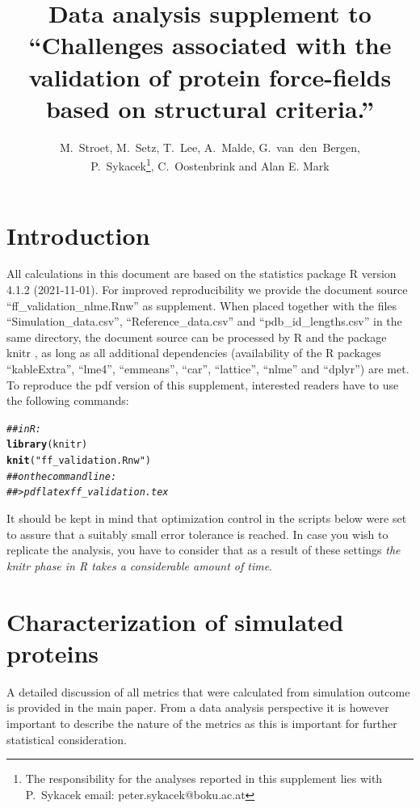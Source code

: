 \documentclass{article}\usepackage[table]{xcolor}
\title{Data analysis supplement to ``Challenges associated with the validation 
  of protein force-fields based on structural criteria.''}
\author{M.~Stroet, M.~Setz, T.~Lee, A.~Malde, G.~van~den~Bergen, 
  \\P.~Sykacek\footnote{The responsibility for the analyses reported 
    in this supplement lies with P.~Sykacek email: peter.sykacek@boku.ac.at}, 
  C.~Oostenbrink and Alan E. Mark}
\makeatletter
\newcommand{\hlstr}[1]{\textcolor[rgb]{0.192,0.494,0.8}{#1}}%
\newcommand{\hlcom}[1]{\textcolor[rgb]{0.678,0.584,0.686}{\textit{#1}}}%
\newcommand{\hlstd}[1]{\textcolor[rgb]{0.345,0.345,0.345}{#1}}%
\newcommand{\hlkwd}[1]{\textcolor[rgb]{0.737,0.353,0.396}{\textbf{#1}}}%
\newenvironment{kframe}{%
 \def\at@end@of@kframe{}%
 \ifinner\ifhmode%
  \def\at@end@of@kframe{\end{minipage}}%
  \begin{minipage}{\columnwidth}%
 \fi\fi%
 \def\FrameCommand##1{\hskip\@totalleftmargin \hskip-\fboxsep
 \colorbox{shadecolor}{##1}\hskip-\fboxsep
     \hskip-\linewidth \hskip-\@totalleftmargin \hskip\columnwidth}%
 \MakeFramed {\advance\hsize-\width
   \@totalleftmargin\z@ \linewidth\hsize
   \@setminipage}}%
 {\par\unskip\endMakeFramed%
 \at@end@of@kframe}
\newenvironment{knitrout}{}{} %
\renewcommand{\$}{$} %
\makeatother
\begin{document}
\maketitle
\section{Introduction} 


All calculations in this document are based on the statistics package
R version 4.1.2 (2021-11-01). %
For improved reproducibility we provide the document source
``ff\_validation\_nlme.Rnw'' as supplement. When placed together with
the files ``Simulation\_data.csv'', ``Reference\_data.csv'' and
``pdb\_id\_lengths.csv'' in the same directory, the document source
can be processed by R and the package knitr \cite{Xie:2014, Xie:2015},
as long as all additional dependencies (availability of the R packages
``kableExtra'', ``lme4'', ``emmeans'', ``car'', ``lattice'', ``nlme''
and ``dplyr'') are met. To reproduce the pdf version of this
supplement, interested readers have to use the following commands:
\begin{knitrout}
\color{fgcolor}\begin{kframe}
\begin{alltt}
\hlcom{## in R:}
\hlkwd{library}\hlstd{(knitr)}
\hlkwd{knit}\hlstd{(}\hlstr{"ff_validation.Rnw"}\hlstd{)}
\hlcom{## on the command line:}
\hlcom{## > pdflatex ff_validation.tex}
\end{alltt}
\end{kframe}
\end{knitrout}

It should be kept in mind that optimization control in the scripts
below were set to assure that a suitably small error tolerance is
reached. In case you wish to replicate the analysis, you have to
consider that as a result of these settings {\em the knitr phase in R
  takes a considerable amount of time}.
\section{Characterization of simulated proteins}
A detailed discussion of all metrics that were calculated from
simulation outcome is provided in the main paper. From a data analysis
perspective it is however important to describe the nature of the
metrics as this is important for further statistical consideration.
\end{document}
